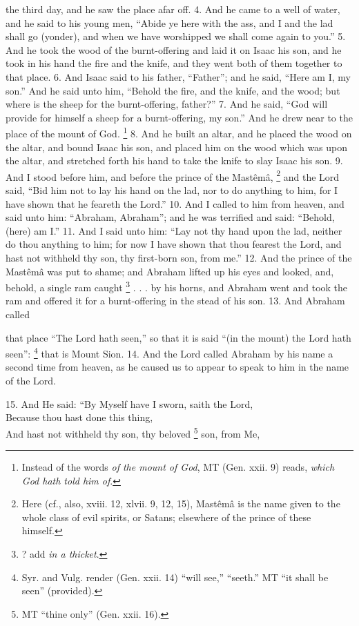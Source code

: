 the third day, and he saw the place afar off. 4. And he came to a well of water, and he said to his young men, ``Abide ye here with the ass, and I and the lad shall go (yonder), and when we have worshipped we shall come again to you.'' 5. And he took the wood of the burnt-offering and laid it on Isaac his son, and he took in his hand the fire and the knife, and they went both of them together to that place. 6. And Isaac said to his father, ``Father''; and he said, ``Here am I, my son.'' And he said unto him, ``Behold the fire, and the knife, and the wood; but where is the sheep for the burnt-offering, father?'' 7. And he said, ``God will provide for himself a sheep for a burnt-offering, my son.'' And he drew near to the place of the mount of God. \footnote{Instead of the words \emph{of the mount of God}, MT (Gen. xxii. 9) reads, \emph{which God hath told him of}.} 8. And he built an altar, and he placed the wood on the altar, and bound Isaac his son, and placed him on the wood which was upon the altar, and stretched forth his hand to take the knife to slay Isaac his son. 9. And I stood before him, and before the prince of the Mastêmâ, \footnote{Here (cf., also, xviii. 12, xlvii. 9, 12, 15), Mastêmâ is the name given to the whole class of evil spirits, or Satans; elsewhere of the prince of these himself.} and the Lord said, ``Bid him not to lay his hand on the lad, nor to do anything to him, for I have shown that he feareth the Lord.'' 10. And I called to him from heaven, and said unto him: ``Abraham, Abraham''; and he was terrified and said: ``Behold, (here) am I.'' 11. And I said unto him: ``Lay not thy hand upon the lad, neither do thou anything to him; for now I have shown that thou fearest the Lord, and hast not withheld thy son, thy first-born son, from me.'' 12. And the prince of the Mastêmâ was put to shame; and Abraham lifted up his eyes and looked, and, behold, a single ram caught \footnote{? add \emph{in a thicket}.} . . . by his horns, and Abraham went and took the ram and offered it for a burnt-offering in the stead of his son. 13. And Abraham called

that place ``The Lord hath seen,'' so that it is said ``(in the mount) the Lord hath seen'': \footnote{Syr. and Vulg. render (Gen. xxii. 14) ``will see,'' ``seeth.'' MT ``it shall be seen'' (provided).} that is Mount Sion. 14. And the Lord called Abraham by his name a second time from heaven, as he caused us to appear to speak to him in the name of the Lord.

15. And He said: ``By Myself have I sworn, saith the Lord,\\
Because thou hast done this thing,\\
And hast not withheld thy son, thy beloved \footnote{MT ``thine only'' (Gen. xxii. 16).} son, from Me,

